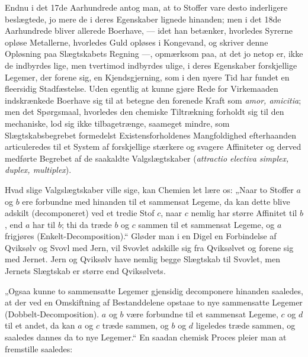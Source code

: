 \documentclass[12pt,a4paper]{book}
\begin{document}
Endnu i det 17de Aarhundrede antog man, at to Stoffer vare desto
inderligere beslægtede, jo mere de i deres Egenskaber lignede
hinanden; men i det 18de Aarhundrede bliver allerede Boerhave, ---
idet han betænker, hvorledes Syrerne opløse Metallerne, hvorledes
Guld opløses i Kongevand, og skriver denne Opløsning paa
Slægtskabets Regning ---, opmærksom paa, at det jo netop er, ikke
de indbyrdes lige, men tvertimod indbyrdes ulige, i deres
Egenskaber forskjellige Legemer, der forene sig, en Kjendsgjerning,
som i den nyere Tid har fundet en fleersidig Stadfæstelse. Uden
egentlig at kunne gjøre Rede for Virkemaaden indskrænkede Boerhave
sig til at
betegne den forenede Kraft som \textit{amor, amicitia}; men det
Spørgsmaal, hvorledes den chemiske Tiltrækning forholdt sig til den
mechaniske, lod sig ikke tilbagetrænge, saameget mindre, som
Slægtskabsbegrebet formedelst Existensforholdenes Mangfoldighed
efterhaanden
articuleredes til et System af forskjellige stærkere og svagere
Affiniteter og derved medførte Begrebet af de saakaldte
Valgslægtskaber (\textit{attractio electiva simplex, duplex,
multiplex}).

Hvad slige Valgslægtskaber ville sige, kan Chemien let lære os:
„Naar to Stoffer $a$ og $b$ ere forbundne med hinanden til et
sammensat Legeme, da kan dette blive adskilt (decomponeret) ved et
tredie Stof $c$, naar $c$ nemlig har større Affinitet til $b$, end
$a$ har til $b$; thi da træde $b$ og $c$ sammen til et sammensat
Legeme, og $a$ frigjøres (Enkelt-Decomposition).“ Gløder man i en
Digel en Forbindelse af Qviksølv og Svovl med Jern, vil Svovlet
adskille sig fra Qviksølvet og forene sig med Jernet. Jern og
Qviksølv have nemlig begge Slægtskab til Svovlet, men Jernets
Slægtskab er større end Qviksølvets.

„Ogsaa kunne to sammensatte Legemer gjensidig decomponere
hinanden saaledes, at der ved en Omskiftning af Bestanddelene
opstaae to nye sammensatte Legemer (Dobbelt-Decomposition). $a$ og
$b$ være forbundne til et sammensat Legeme, $c$ og $d$ til et
andet, da kan $a$ og $c$ træde sammen, og $b$ og $d$ ligeledes
træde sammen, og saaledes dannes da to nye Legemer.“ En saadan
chemisk Proces pleier man at fremstille saaledes:
\end{document}
